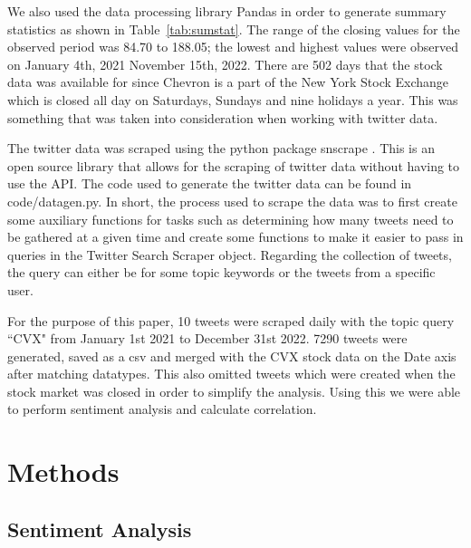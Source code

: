 \documentclass[12pt, letterpaper, titlepage]{article}
\begin{document}
We also used the data processing library Pandas in order to generate summary statistics as shown in Table~\ref{tab:sumstat}.
The range of the closing values for the observed period was 84.70 to 188.05; the lowest and highest values were observed on January 4th, 2021 November 15th, 2022. There are 502 days that the stock data was available for since Chevron is a part of the New York Stock Exchange which is closed all day on Saturdays, Sundays and nine holidays a year. This was something that was taken into consideration when working with twitter data. 


The twitter data was scraped using the python package snscrape \citep{justanotherarchivist_2022}. This is an open source library that allows for the scraping of twitter data without having to use the API. The code used to generate the twitter data can be found in code/datagen.py. In short, the process used to scrape the data was to first create some auxiliary functions for tasks such as determining how many tweets need to be gathered at a given time and create some functions to make it easier to pass in queries in the Twitter Search Scraper object. Regarding the collection of tweets, the query can either be for some topic keywords or the tweets from a specific user. 


For the purpose of this paper, 10 tweets were scraped daily with the topic query ``CVX" from January 1st 2021 to December 31st 2022.  7290 tweets were generated, saved as a csv and merged with the CVX stock data on the Date axis after matching datatypes. This also omitted tweets which were created when the stock market was closed in order to simplify the analysis. Using this we were able to perform sentiment analysis and calculate correlation.


\section{Methods}
\label{sec:methods}

\subsection{Sentiment Analysis}
\end{document}
